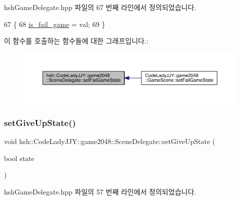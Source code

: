 hsh\+Game\+Delegate.\+hpp 파일의 67 번째 라인에서 정의되었습니다.


\begin{DoxyCode}
67                                                \{
68                     \hyperlink{classhsh_1_1_code_lady_j_j_y_1_1game2048_1_1_scene_delegate_a73d468ae6105f774847049e83ea5cc61}{is\_fail\_game} = val;
69                 \}
\end{DoxyCode}
이 함수를 호출하는 함수들에 대한 그래프입니다.\+:
\nopagebreak
\begin{figure}[H]
\begin{center}
\leavevmode
\includegraphics[width=350pt]{d7/d4d/classhsh_1_1_code_lady_j_j_y_1_1game2048_1_1_scene_delegate_adc205b068a4df3da173c37d4236a4e25_icgraph}
\end{center}
\end{figure}
\mbox{\label{classhsh_1_1_code_lady_j_j_y_1_1game2048_1_1_scene_delegate_a26d362200e9644c85f892e71592eef92}} 
\subsubsection{\texorpdfstring{set\+Give\+Up\+State()}{setGiveUpState()}}
{\footnotesize\ttfamily void hsh\+::\+Code\+Lady\+J\+J\+Y\+::game2048\+::\+Scene\+Delegate\+::set\+Give\+Up\+State (\begin{DoxyParamCaption}\item[{bool}]{state }\end{DoxyParamCaption})\hspace{0.3cm}{\ttfamily [inline]}}



hsh\+Game\+Delegate.\+hpp 파일의 57 번째 라인에서 정의되었습니다.


